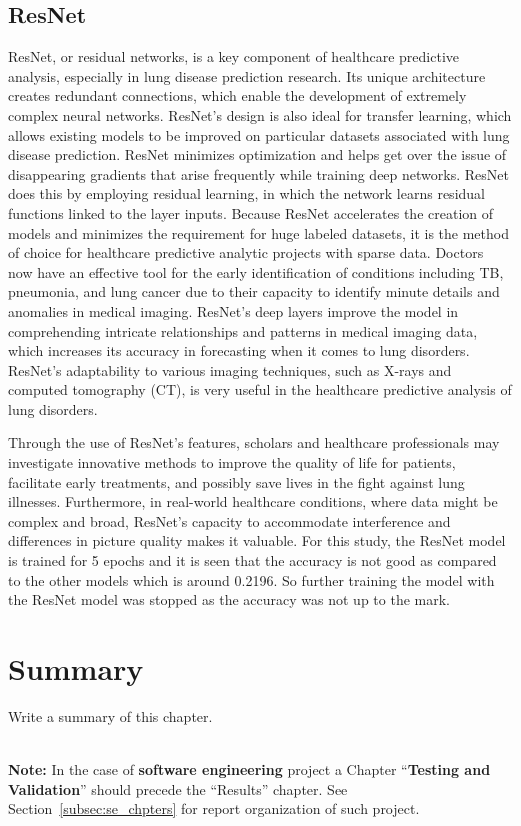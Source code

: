 \subsection{ResNet}
ResNet, or residual networks, is a key component of healthcare predictive analysis, especially in lung disease prediction research. Its unique architecture creates redundant connections, which enable the development of extremely complex neural networks. ResNet’s design is also ideal for transfer learning, which allows existing models to be improved on particular datasets associated with lung disease prediction. ResNet minimizes optimization and helps get over the issue of disappearing gradients that arise frequently while training deep networks. ResNet does this by employing residual learning, in which the network learns residual functions linked to the layer inputs. Because ResNet accelerates the creation of models and minimizes the requirement for huge labeled datasets, it is the method of choice for healthcare predictive analytic projects with sparse data. Doctors now have an effective tool for the early identification of conditions including TB, pneumonia, and lung cancer due to their capacity to identify minute details and anomalies in medical imaging. ResNet's deep layers improve the model in comprehending intricate relationships and patterns in medical imaging data, which increases its accuracy in forecasting when it comes to lung disorders. ResNet's adaptability to various imaging techniques, such as X-rays and computed tomography (CT), is very useful in the healthcare predictive analysis of lung disorders. 

Through the use of ResNet's features, scholars and healthcare professionals may investigate innovative methods to improve the quality of life for patients, facilitate early treatments, and possibly save lives in the fight against lung illnesses. Furthermore, in real-world healthcare conditions, where data might be complex and broad, ResNet's capacity to accommodate interference and differences in picture quality makes it valuable. For this study, the ResNet model is trained for 5 epochs and it is seen that the accuracy is not good as compared to the other models which is around 0.2196. So further training the model with the ResNet model was stopped as the accuracy was not up to the mark. 





\section{Summary}
Write a summary of this chapter.

~\\[5em]
\noindent
{\huge\textbf{Note:}} In the case of \textbf{software engineering} project a Chapter ``\textbf{Testing and Validation}'' should precede the ``Results'' chapter. See Section~\ref{subsec:se_chpters} for report organization of such project. 

